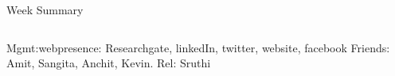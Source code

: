 \documentclass[serif, mathserif, final]{beamer}
\newcommand{\te}[1]{\textit{TimeEst:}\textit{#1}}
\newcommand{\comments}[1]{}
\begin{document}
\begin{frame}
\begin{columns}
\begin{column}{0.5\linewidth}
\begin{block}{Week Summary}
\begin{column}{0.25\linewidth}
\begin{block} 
Mgmt:webpresence: 
Researchgate, linkedIn, twitter, website, facebook 
Friends: Amit, Sangita, Anchit, Kevin. 
Rel: Sruthi 
\end{block} 
\end{column}%






\comments{
      \begin{block}{Week Daily Schedule} 
        \begin{columns} 
          \column{0.14\textwidth}{\textbf{\small \underline{Mon}}}
          \textbf{\small todo} \\ 
          \begin{itemize}
            \tiny \item \tiny Add in schedule
          \item \tiny 
          \end{itemize} 
          \textbf{\small schedule} \\
          \begin{enumerate} 
            \tiny \item \tiny 8-9AM: Regular Routines 
          \end{enumerate} 
          
          \column{0.14\textwidth}{\textbf{\small \underline{Tue}}}
          \textbf{\small todo} \\
          \begin{itemize}
            \tiny \item \tiny Work: make project sheet \te{10 minutes} 
          \item \tiny Mgmt:Spaces: check for diploma \te{10 minutes} 
          \end{itemize}  
          \textbf{\small schedule} 
          \begin{enumerate}
            \tiny \item \tiny 10AM - 11AM = 
          \item \tiny 11AM - 12AM = make long-term goals 
          \item \tiny 12PM - 2PM = 
            \tiny \item \tiny 2PM -3PM = 
          \item \tiny 6PM - 10PM = 
          \end{enumerate} 
          

\end{columns}
\end{block}}
\end{block}
\end{column}
\end{columns}
\end{frame}
\end{document}
